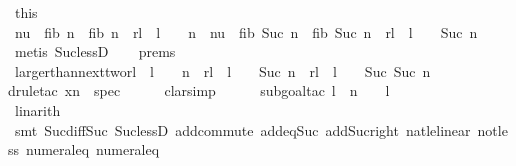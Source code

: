 \begin{isabellebody}
\ this\ \isamarkupfalse%
\ n{}{\isacharcolon}{\isachardoublequoteopen}u\ {\isacharasterisk}\ fib\ n\ {\isacharplus}\ fib{}\ n\ {\isasymle}\ rl\ {\isacharbang}\ {\isacharparenleft}l\ {\isacharminus}\ {}\ {\isacharminus}\ n{\isacharparenright}{\isachardoublequoteclose}\ \ n{}{\isacharcolon}{\isachardoublequoteopen}u\ {\isacharasterisk}\ fib\ {\isacharparenleft}Suc\ n{\isacharparenright}\ {\isacharplus}\ fib{}\ {\isacharparenleft}Suc\ n{\isacharparenright}\ {\isasymle}\ rl\ {\isacharbang}\ {\isacharparenleft}l\ {\isacharminus}\ {}\ {\isacharminus}\ Suc\ n{\isacharparenright}{\isachardoublequoteclose}\isanewline
\ \ \ \ \isamarkupfalse%
\ {\isacharparenleft}metis\ Suc{\isacharunderscore}lessD{\isacharparenright}{\isacharplus}\isanewline
\ \ \isamarkupfalse%
\ {\isachardoublequoteopen}{}{\isachardot}prems{\isachardoublequoteclose}\ \ \isamarkupfalse%
\ larger{\isacharunderscore}than{\isacharunderscore}next{\isacharunderscore}two{\isacharcolon}{\isachardoublequoteopen}rl\ {\isacharbang}\ {\isacharparenleft}l\ {\isacharminus}\ {}\ {\isacharminus}\ n{\isacharparenright}\ {\isacharplus}\ rl\ {\isacharbang}\ {\isacharparenleft}l\ {\isacharminus}\ {}\ {\isacharminus}\ Suc\ n{\isacharparenright}\ {\isacharless}\ rl\ {\isacharbang}\ {\isacharparenleft}l\ {\isacharminus}\ {}\ {\isacharminus}\ Suc\ {\isacharparenleft}Suc\ n{\isacharparenright}{\isacharparenright}{\isachardoublequoteclose}\ \isanewline
\ \ \ \ \isamarkupfalse%
{\isacharparenleft}drule{\isacharunderscore}tac\ x{\isacharequal}{\isachardoublequoteopen}n{\isacharplus}{}{\isachardoublequoteclose}\ \ spec{\isacharparenright}\isanewline
\ \ \ \ \isamarkupfalse%
\ {\isacharparenleft}clarsimp{\isacharparenright}\isanewline
\ \ \ \ \isamarkupfalse%
\ {\isacharparenleft}subgoal{\isacharunderscore}tac\ {\isachardoublequoteopen}l\ {\isacharminus}\ {\isacharparenleft}n\ {\isacharplus}\ {}{\isacharparenright}\ {\isacharless}\ l\ {\isacharminus}\ {}{\isachardoublequoteclose}{\isacharparenright}\isanewline
\ \ \ \ \ \isamarkupfalse%
\ {}\isanewline
\ \ \ \ \ \isamarkupfalse%
\ linarith\isanewline
\ \ \ \ \isamarkupfalse%
\ {\isacharparenleft}smt\ Suc{\isacharunderscore}diff{\isacharunderscore}Suc\ Suc{\isacharunderscore}lessD\ add{\isachardot}commute\ add{\isacharunderscore}{}{\isacharunderscore}eq{\isacharunderscore}Suc{\isacharprime}\ add{\isacharunderscore}Suc{\isacharunderscore}right\ nat{\isacharunderscore}le{\isacharunderscore}linear\ not{\isacharunderscore}less\ numeral{\isacharunderscore}{}{\isacharunderscore}eq{\isacharunderscore}{}\ numeral{\isacharunderscore}{}{\isacharunderscore}eq{\isacharunderscore}{}{\isacharparenright}\isanewline

\end{isabellebody}
